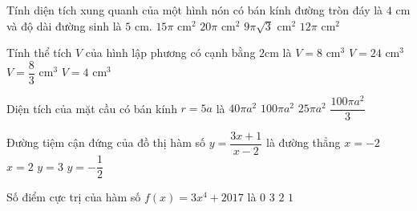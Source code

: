 \begin{ex}%
	Tính diện tích xung quanh của một hình nón có bán kính đường tròn đáy là $4\text{ cm}$ và độ dài đường sinh là $5\text{ cm}$.
	\choice
	{$15\pi \text{ cm}^2$ }
	{\True $20\pi \text{ cm}^2$ }
	{$9\pi \sqrt{3}\text{ cm}^2$ }
	{$12\pi \text{ cm}^2$ }
\end{ex}




\begin{ex}%
	Tính thể tích $V$ của hình lập phương có cạnh bằng $2 \text{cm}$ là 
	\choice
	{\True $V=8\text{ cm}^3$}
	{$V=24\text{ cm}^3$}
	{$V=\dfrac{8}{3}\text{ cm}^3$}
	{$V=4 \text{ cm}^3$}
\end{ex}



\begin{ex}%
	Diện tích của mặt cầu có bán kính $r=5a$ là 
	\choice
	{$40\pi a^2$}
	{\True $100\pi a^2$}
	{$25\pi a^2$}
	{$\dfrac{100\pi a^2}{3}$}
\end{ex}



\begin{ex}%
	Đường tiệm cận đứng của đồ thị hàm số $y=\dfrac{3x+1}{x-2}$ là đường thẳng
	\choice
	{$x=-2$}
	{\True $x=2$}
	{$y=3$}
	{$y=-\dfrac{1}{2}$}
\end{ex}



 \begin{ex}%
	Số điểm cực trị của hàm số $f(x)=3x^4+2017$ là
	\choice
	{$0$}
	{$3$}
	{$2$}
	{\True $1$}
\end{ex}




